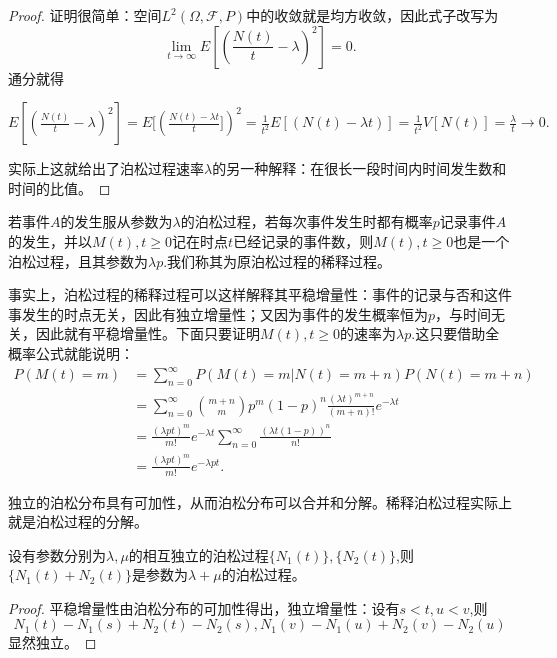 \documentclass[lang=cn,10pt]{elegantbook}
\begin{document}
	\begin{proof}
		证明很简单：空间\(L^2(\Omega,\mathcal{F},P)\)中的收敛就是均方收敛，因此式子改写为
		\[\lim_{t \to \infty}E[(\frac{N(t)}{t}-\lambda)^2]=0.\]
		通分就得

		\(E[(\frac{N(t)}{t}-\lambda)^2]=E[(\frac{N(t)-\lambda t}{t}])^2=\frac{1}{t^2}E[(N(t)-\lambda t)]=\frac{1}{t^2}V[N(t)]=\frac{\lambda}{t}\to 0.\)

		实际上这就给出了泊松过程速率\(\lambda\)的另一种解释：在很长一段时间内时间发生数和时间的比值。
	\end{proof}


	若事件\(A\)的发生服从参数为\(\lambda\)的泊松过程，若每次事件发生时都有概率\(p\)记录事件\(A\)的发生，并以\(M(t),t\ge 0\)记在时点\(t\)已经记录的事件数，则\(M(t),t\ge 0\)也是一个泊松过程，且其参数为\(\lambda p\).我们称其为原泊松过程的稀释过程。

	事实上，泊松过程的稀释过程可以这样解释其平稳增量性：事件的记录与否和这件事发生的时点无关，因此有独立增量性；又因为事件的发生概率恒为\(p\)，与时间无关，因此就有平稳增量性。下面只要证明\(M(t),t\ge 0\)的速率为\(\lambda p\).这只要借助全概率公式就能说明：
	\begin{align*}
		P(M(t)=m)&=\sum_{n=0}^{\infty}P(M(t)=m|N(t)=m+n)P(N(t)=m+n)\\
		&=\sum_{n=0}^{\infty}\binom{m+n}{m}p^m(1-p)^n\frac{(\lambda t)^{m+n}}{(m+n)!}e^{-\lambda t}\\
		&=\frac{(\lambda pt)^m}{m!}e^{-\lambda t}\sum_{n=0}^{\infty}\frac{(\lambda t(1-p))^n}{n!}\\
		&=\frac{(\lambda pt)^m}{m!}e^{-\lambda pt}.
	\end{align*}
	
	独立的泊松分布具有可加性，从而泊松分布可以合并和分解。稀释泊松过程实际上就是泊松过程的分解。
	\begin{theorem}[泊松过程的合并]
		设有参数分别为\(\lambda,\mu\)的相互独立的泊松过程\(\{N_1(t)\},\{N_2(t)\}\),则\(\{N_1(t)+N_2(t)\}\)是参数为\(\lambda+\mu\)的泊松过程。
	\end{theorem}
	\begin{proof}
		平稳增量性由泊松分布的可加性得出，独立增量性：设有\(s<t,u<v\),则
		\[N_1(t)-N_1(s)+N_2(t)-N_2(s),N_1(v)-N_1(u)+N_2(v)-N_2(u)\]
		显然独立。
	\end{proof}
\end{document}
